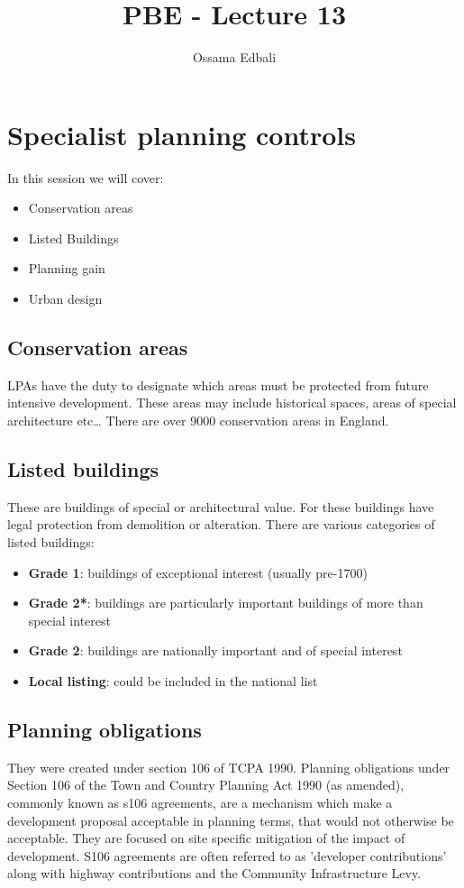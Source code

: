 \documentclass{article}
\title{PBE - Lecture 13}
\author{Ossama Edbali}
\begin{document}
	
	\maketitle
	
	\section*{Specialist planning controls}	
	In this session we will cover:
	\begin{itemize}
		\item Conservation areas
		\item Listed Buildings
		\item Planning gain
		\item Urban design
	\end{itemize}
	
	\subsection*{Conservation areas}
	LPAs have the duty to designate which areas must be protected from future intensive development. These
	areas may include historical spaces, areas of special architecture etc\ldots
	There are over 9000 conservation areas in England.
	
	\subsection*{Listed buildings}
	These are buildings of special or architectural value. For these 
	buildings have legal protection from demolition or alteration.
	There are various categories of listed buildings:
	\begin{itemize}
		\item \textbf{Grade 1}: buildings of exceptional interest (usually pre-1700)
		\item \textbf{Grade 2*}: buildings are particularly important buildings of more than special interest
		\item \textbf{Grade 2}: buildings are nationally important and of special interest
		\item \textbf{Local listing}: could be included in the national list 
	\end{itemize}
	
	\subsection*{Planning obligations}
	They were created under section 106 of TCPA 1990.
	Planning obligations under Section 106 of the Town and Country Planning Act 1990 (as amended), commonly known as s106
	agreements, are a mechanism which make a development proposal acceptable in planning terms, that would not otherwise
	be acceptable. They are focused on site specific mitigation of the impact of development. S106 agreements are often 
	referred to as 'developer contributions' along with highway contributions and the Community Infrastructure Levy.
	
	
	
\end{document}
